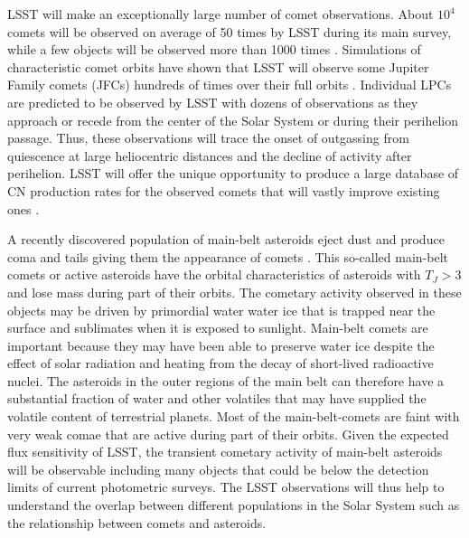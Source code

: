 LSST will make an exceptionally large number of comet
observations.  About $10^4$ comets will be observed on average
of 50 times by LSST during its main survey, while a few objects
will be observed more than 1000 times
\citep{2010PhDT.......241S}.  Simulations of characteristic
comet orbits have shown that LSST will observe some Jupiter
Family comets (JFCs) hundreds of times over their full orbits
\citep{2010PhDT.......241S}.  Individual LPCs are predicted to
be observed by LSST with dozens of observations as they
approach or recede from the center of the Solar System or
during their perihelion passage.  Thus, these observations
will trace the onset of outgassing from quiescence at large
heliocentric distances and the decline of activity after
perihelion.  LSST will offer the unique opportunity to produce
a large database of CN production rates for the observed
comets that will vastly improve existing ones \citep[see
e.g.][]{1995Icar..118..223A,2012ApJ...758...29A}.

A recently discovered population of main-belt asteroids eject
dust and produce coma and tails giving them the appearance of
comets \citep{2012AJ....143...66J}.  This so-called main-belt
comets or active asteroids have the orbital characteristics of
asteroids with $T_J > 3$ and lose mass during part of their
orbits. The cometary activity observed in these objects may be
driven by primordial water water ice that is trapped near the
surface and sublimates when it is exposed to sunlight.
Main-belt comets are important because they may have been able to
preserve water ice despite the effect of solar radiation and
heating from the decay of short-lived radioactive nuclei.  The
asteroids in the outer regions of the main belt can therefore
have a substantial fraction of water and other volatiles that
may have supplied the volatile content of terrestrial planets.
Most of the main-belt-comets are faint with very weak comae
that are active during part of their orbits. Given the
expected flux sensitivity of LSST, the transient cometary
activity of main-belt asteroids will be observable including
many objects that could be below the detection limits of
current photometric surveys.  The LSST observations will thus
help to understand the overlap between different populations
in the Solar System such as the relationship between comets
and asteroids.

